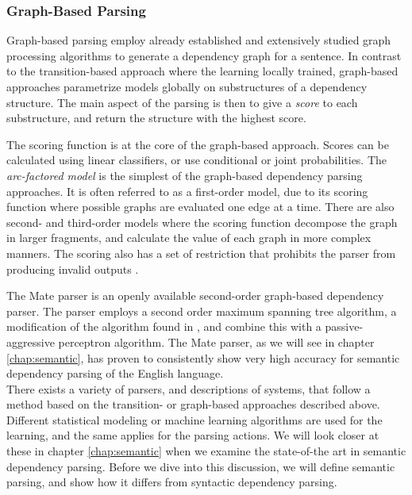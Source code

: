 \subsubsection{Graph-Based Parsing}
\label{ssc:background:graph-based-parsing}
Graph-based parsing employ already established and extensively studied graph processing algorithms to generate a dependency graph for a sentence. In contrast to the transition-based approach where the learning locally trained, graph-based approaches parametrize models globally on substructures of a dependency structure. The main aspect of the parsing is then to give a \textit{score} to each substructure, and return the structure with the highest score. 

The scoring function is at the core of the graph-based approach. Scores can be calculated using linear classifiers, or use conditional or joint probabilities. The \textit{arc-factored model} is the simplest of the graph-based dependency parsing approaches. It is often referred to as a first-order model, due to its scoring function where possible graphs are evaluated one edge at a time. There are also second- and third-order models where the scoring function decompose the graph in larger fragments, and calculate the value of each graph in more complex manners. The scoring also has a set of restriction that prohibits the parser from producing invalid outputs \cite{KublerEtAl:09}.

The Mate parser \cite{Boh:10} is an openly available second-order graph-based dependency parser. The parser employs a second order maximum spanning tree algorithm, a modification of the algorithm found in , and combine this with a passive-aggressive perceptron algorithm. The Mate parser, as we will see in chapter \ref{chap:semantic}, has proven to consistently show very high accuracy for semantic dependency parsing of the English language.\\

\noindent There exists a variety of parsers, and descriptions of systems, that follow a method based on the transition- or graph-based approaches described above. Different statistical modeling or machine learning algorithms are used for the learning, and the same applies for the parsing actions. We will look closer at these in chapter \ref{chap:semantic} when we examine the state-of-the art in semantic dependency parsing. Before we dive into this discussion, we will define semantic parsing, and show how it differs from syntactic dependency parsing.

